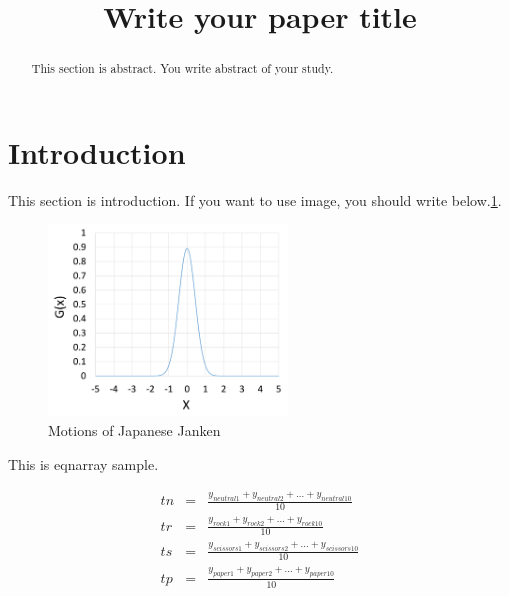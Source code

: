 \documentclass[conference]{IEEEtran}
\begin{document}
\title{Write your paper title}

\author{
}


\maketitle


\begin{abstract}
This section is abstract.
You write abstract of your study.

\end{abstract}


\IEEEpeerreviewmaketitle


\section{Introduction}
  This section is introduction.
  If you want to use image, you should write below.\figurename \ref{fig:gaussian_function}.

  \begin{figure}[!t]
    \centering
    \includegraphics[width=2.5in]{./images/gaussian_function.png}
    \caption{Motions of Japanese Janken}
    \label{fig:gaussian_function}
  \end{figure}

  This is eqnarray sample.

  \begin{eqnarray}
    tn & = & \frac{y_{neutral1} + y_{neutral2} + ... + y_{neutral10}}{10}\\
    tr & = & \frac{y_{rock1} + y_{rock2} + ... + y_{rock10}}{10}\\
    ts & = & \frac{y_{scissors1} + y_{scissors2} + ... + y_{scissors10}}{10}\\
    tp & = & \frac{y_{paper1} + y_{paper2} + ... + y_{paper10}}{10}
  \end{eqnarray}
\end{document}
